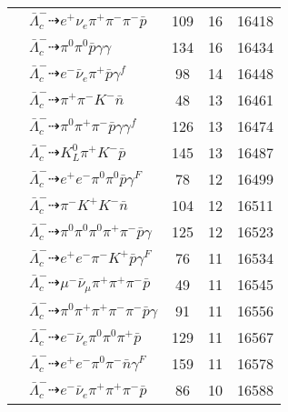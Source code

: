 \documentclass[landscape]{article}
\newcounter{rownumbers}
\newcommand\rn{\stepcounter{rownumbers}\arabic{rownumbers}}
\newcommand{\EOL}{\\} %
\newcommand{\topoTags}[1]{#1} %
\begin{document}
\begin{longtable}{clccc}
\rn & $ \bar{\Lambda}_{c}^{-} \dashrightarrow e^{+} \nu_{e} \pi^{+} \pi^{-} \pi^{-} \bar{p} $ & \topoTags{109 & }16 & 16418 \EOL

\rn & $ \bar{\Lambda}_{c}^{-} \dashrightarrow \pi^{0} \pi^{0} \bar{p} \gamma \gamma $ & \topoTags{134 & }16 & 16434 \EOL

\rn & $ \bar{\Lambda}_{c}^{-} \dashrightarrow e^{-} \bar{\nu}_{e} \pi^{+} \bar{p} \gamma^{f} $ & \topoTags{98 & }14 & 16448 \EOL

\rn & $ \bar{\Lambda}_{c}^{-} \dashrightarrow \pi^{+} \pi^{-} K^{-} \bar{n} $ & \topoTags{48 & }13 & 16461 \EOL

\rn & $ \bar{\Lambda}_{c}^{-} \dashrightarrow \pi^{0} \pi^{+} \pi^{-} \bar{p} \gamma \gamma^{f} $ & \topoTags{126 & }13 & 16474 \EOL

\rn & $ \bar{\Lambda}_{c}^{-} \dashrightarrow K_{L}^{0} \pi^{+} K^{-} \bar{p} $ & \topoTags{145 & }13 & 16487 \EOL

\rn & $ \bar{\Lambda}_{c}^{-} \dashrightarrow e^{+} e^{-} \pi^{0} \pi^{0} \bar{p} \gamma^{F} $ & \topoTags{78 & }12 & 16499 \EOL

\rn & $ \bar{\Lambda}_{c}^{-} \dashrightarrow \pi^{-} K^{+} K^{-} \bar{n} $ & \topoTags{104 & }12 & 16511 \EOL

\rn & $ \bar{\Lambda}_{c}^{-} \dashrightarrow \pi^{0} \pi^{0} \pi^{0} \pi^{+} \pi^{-} \bar{p} \gamma $ & \topoTags{125 & }12 & 16523 \EOL

\rn & $ \bar{\Lambda}_{c}^{-} \dashrightarrow e^{+} e^{-} \pi^{-} K^{+} \bar{p} \gamma^{F} $ & \topoTags{76 & }11 & 16534 \EOL

\rn & $ \bar{\Lambda}_{c}^{-} \dashrightarrow \mu^{-} \bar{\nu}_{\mu} \pi^{+} \pi^{+} \pi^{-} \bar{p} $ & \topoTags{49 & }11 & 16545 \EOL

\rn & $ \bar{\Lambda}_{c}^{-} \dashrightarrow \pi^{0} \pi^{+} \pi^{+} \pi^{-} \pi^{-} \bar{p} \gamma $ & \topoTags{91 & }11 & 16556 \EOL

\rn & $ \bar{\Lambda}_{c}^{-} \dashrightarrow e^{-} \bar{\nu}_{e} \pi^{0} \pi^{0} \pi^{+} \bar{p} $ & \topoTags{129 & }11 & 16567 \EOL

\rn & $ \bar{\Lambda}_{c}^{-} \dashrightarrow e^{+} e^{-} \pi^{0} \pi^{-} \bar{n} \gamma^{F} $ & \topoTags{159 & }11 & 16578 \EOL

\rn & $ \bar{\Lambda}_{c}^{-} \dashrightarrow e^{-} \bar{\nu}_{e} \pi^{+} \pi^{+} \pi^{-} \bar{p} $ & \topoTags{86 & }10 & 16588 \EOL


\end{longtable}
\end{document}
